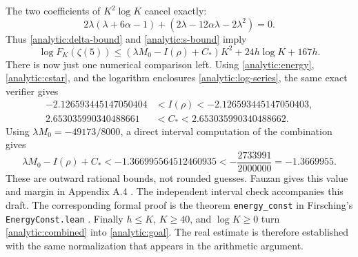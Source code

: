 The two coefficients of \(K^2\log K\) cancel exactly:
\[
 2\lambda(\lambda+6\alpha-1)
       +(2\lambda-12\alpha\lambda-2\lambda^2)=0.
\]
Thus \eqref{analytic:delta-bound} and \eqref{analytic:s-bound} imply
\begin{equation}\label{analytic:combined}
 \log F_K(\zeta(5))
 \leq(\lambda M_0-I(\rho)+C_*)K^2+24h\log K+167h.
\end{equation}
There is now just one numerical comparison left. Using
\eqref{analytic:energy}, \eqref{analytic:cstar}, and the logarithm
enclosures \eqref{analytic:log-series}, the same exact verifier gives
\[
 \begin{split}
 -2.126593445147050404
       &< I(\rho)<-2.126593445147050403,\\
  2.653035990340488661
       &< C_*<2.653035990340488662.
 \end{split}
\]
Using \(\lambda M_0=-49173/8000\), a direct interval computation of
the combination gives
\begin{equation}\label{analytic:constant}
 \lambda M_0-I(\rho)+C_*
 <-1.366995564512460935
 <-\frac{2733991}{2000000}=-1.3669955.
\end{equation}
These are outward rational bounds, not rounded guesses.
Fauzan gives this value and margin in Appendix A.4 \cite{fauzan}.
The independent interval check accompanies this draft.
The corresponding formal proof is the theorem
\texttt{energy\_const} in Firsching's \texttt{EnergyConst.lean} \cite{firsching}.
Finally \(h\leq K\), \(K\geq40\), and \(\log K\geq0\) turn
\eqref{analytic:combined} into \eqref{analytic:goal}.
The real estimate is therefore established with the same normalization
that appears in the arithmetic argument.
